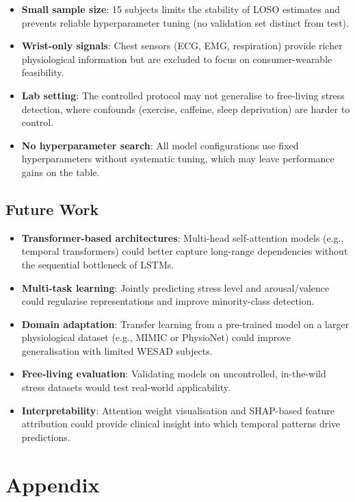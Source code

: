 \documentclass[11pt]{article}
\begin{document}
\begin{itemize}
    \item \textbf{Small sample size}: 15 subjects limits the stability of LOSO estimates and prevents reliable hyperparameter tuning (no validation set distinct from test).
    \item \textbf{Wrist-only signals}: Chest sensors (ECG, EMG, respiration) provide richer physiological information but are excluded to focus on consumer-wearable feasibility.
    \item \textbf{Lab setting}: The controlled protocol may not generalise to free-living stress detection, where confounds (exercise, caffeine, sleep deprivation) are harder to control.
    \item \textbf{No hyperparameter search}: All model configurations use fixed hyperparameters without systematic tuning, which may leave performance gains on the table.
\end{itemize}

\subsection{Future Work}

\begin{itemize}    \item \textbf{Transformer-based architectures}: Multi-head self-attention models (e.g., temporal transformers) could better capture long-range dependencies without the sequential bottleneck of LSTMs.
    \item \textbf{Multi-task learning}: Jointly predicting stress level and arousal/valence could regularise representations and improve minority-class detection.
    \item \textbf{Domain adaptation}: Transfer learning from a pre-trained model on a larger physiological dataset (e.g., MIMIC or PhysioNet) could improve generalisation with limited WESAD subjects.
    \item \textbf{Free-living evaluation}: Validating models on uncontrolled, in-the-wild stress datasets would test real-world applicability.
    \item \textbf{Interpretability}: Attention weight visualisation and SHAP-based feature attribution could provide clinical insight into which temporal patterns drive predictions.
\end{itemize}


\appendix
\section{Appendix}
\label{sec:appendix}
\end{document}
